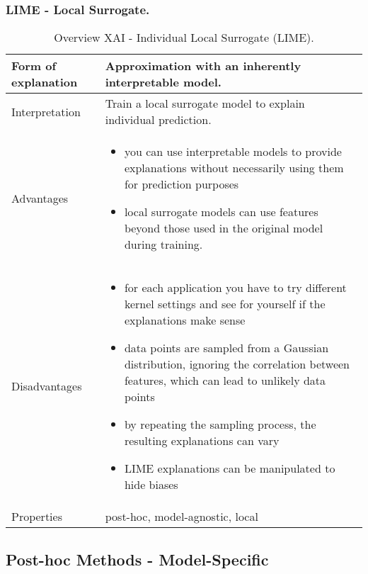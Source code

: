 \subsubsection{LIME - Local Surrogate.}
\begin{table}[H]
  \centering
  \begin{tabular}{|p{}|p{}|}
    \hline
    Form of \newline explanation & 
    Approximation with an inherently interpretable model. \\
    
    \hline
    Interpretation & 
    Train a local surrogate model to explain individual prediction.\\
    \hline
    Advantages &
    \begin{itemize}[nosep, left=0em]
        \item you can use interpretable models to provide explanations without necessarily using them for prediction purposes
        \item local surrogate models can use features beyond those used in the original model during training.
    \end{itemize} \\
    
    \hline
    Disadvantages &
    \begin{itemize}[nosep, left=0em]
        \item for each application you have to try different kernel settings and see for yourself if the explanations make sense
        \item data points are sampled from a Gaussian distribution, ignoring the correlation between features, which can lead to unlikely data points
        \item by repeating the sampling process, the resulting explanations can vary
        \item LIME explanations can be manipulated to hide biases\cite{slack2020fooling}
    \end{itemize} \\
    
    \hline
    Properties & 
    post-hoc, model-agnostic, local  \\
    
    \hline
  \end{tabular}
  \caption{Overview XAI - Individual Local Surrogate (LIME).}
  \label{tab:XAILIME}
\end{table}

\subsection{Post-hoc Methods - Model-Specific}

